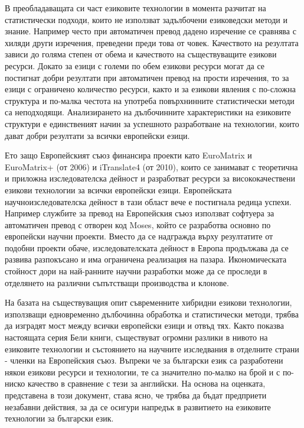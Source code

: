 \documentclass[]{../../metanetpaper}
\begin{document}
\begin{multicols}{2}
В преобладаващата си част езиковите технологии в момента разчитат на статистически подходи, които не използват задълбочени езиковедски методи и знание. Например често при автоматичен превод дадено изречение се сравнява с хиляди други изречения, преведени преди това от човек. Качеството на резултата зависи до голяма степен от обема и качеството на съществуващите езикови ресурси. Докато за езици с големи по обем езикови ресурси могат да се постигнат добри резултати при автоматичен превод на прости изречения, то за езици с ограничено количество ресурси, както и за езикови явления с по-сложна структура и по-малка честота на употреба повърхнинните статистически методи са неподходящи. Анализирането на дълбочинните характеристики на езиковите структури е единственият начин за успешното разработване на технологии, които дават добри резултати за всички европейски езици.


Ето защо Европейският съюз финансира проекти като EuroMatrix и EuroMatrix+ (от 2006) и iTranslate4 (от 2010), които се занимават с теоретична и приложна изследователска дейност и разработват ресурси за висококачествени езикови технологии за всички европейски езици. Европейската научноизследователска дейност в тази област вече е постигнала редица успехи. Например службите за превод на Европейския съюз използват софтуера за автоматичен превод с отворен код Moses, който се разработва основно по европейски научни проекти. Вместо да се надгражда върху резултатите от подобни проекти обаче, изследователската дейност в Европа  продължава да се развива разпокъсано и има ограничена реализация на пазара. Икономическата стойност дори на най-ранните научни разработки може да се проследи в отделянето на различни съпътстващи производства и клонове. %


На базата на съществуващия опит съвременните хибридни езикови технологии, използващи едновременно дълбочинна обработка и статистически методи, трябва да изградят мост между всички европейски езици и отвъд тях. Както показва настоящата серия Бели книги, съществуват огромни разлики в нивото на езиковите технологии и състоянието на научните изследвания в отделните страни - членки на Европейския съюз.
Въпреки че за български език са разработени някои езикови ресурси и технологии, те са значително по-малко на брой и с по-ниско качество в сравнение с тези за английски.
На основа на оценката, представена в този документ, става ясно, че трябва да бъдат предприети незабавни действия, за да се осигури напредък в развитието на езиковите технологии за български език.


\end{multicols}
\end{document}
